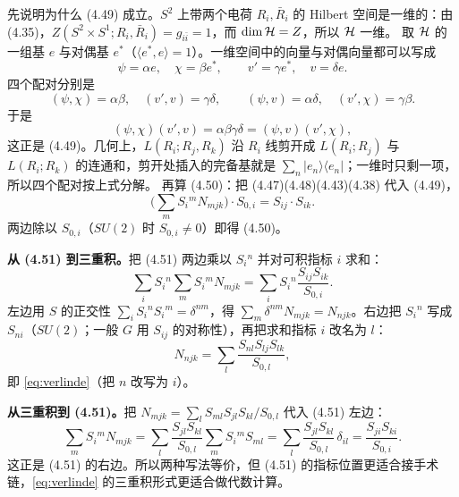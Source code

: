 \begin{derivation}
先说明为什么 (4.49) 成立。$S^2$ 上带两个电荷 $R_i,\bar R_i$ 的 Hilbert 空间是一维的：由 (4.35)，$Z(S^2\times S^1;R_i,\bar R_i)=g_{i\bar i}=1$，而 $\dim\mathcal{H}=Z$，所以 $\mathcal{H}$ 一维。
取 $\mathcal{H}$ 的一组基 $e$ 与对偶基 $e^*$（$\langle e^*,e\rangle=1$）。一维空间中的向量与对偶向量都可以写成
\[
\psi=\alpha e,\quad \chi=\beta e^*,\qquad v'=\gamma e^*,\quad v=\delta e .
\]
四个配对分别是
\[
(\psi,\chi)=\alpha\beta,\quad (v',v)=\gamma\delta,\qquad
(\psi,v)=\alpha\delta,\quad (v',\chi)=\gamma\beta .
\]
于是
\[
(\psi,\chi)(v',v)=\alpha\beta\gamma\delta=(\psi,v)(v',\chi),
\]
这正是 (4.49)。几何上，$L(R_i;R_j,R_k)$ 沿 $R_i$ 线剪开成 $L(R_i;R_j)$ 与 $L(R_i;R_k)$ 的连通和，剪开处插入的完备基就是 $\sum_n|e_n\rangle\langle e_n|$；一维时只剩一项，所以四个配对按上式分解。
再算 (4.50)：把 (4.47)(4.48)(4.43)(4.38) 代入 (4.49)，
\[
\Big(\sum_m S_i{}^m N_{mjk}\Big)\cdot S_{0,i}=S_{ij}\cdot S_{ik}.
\]
两边除以 $S_{0,i}$（$SU(2)$ 时 $S_{0,i}\neq0$）即得 (4.50)。\ours
\end{derivation}

\begin{derivation}[D-9.3：(4.51) 与三重积形式等价]
\textbf{从 (4.51) 到三重积。}把 (4.51) 两边乘以 $S_i{}^n$ 并对可积指标 $i$ 求和：
\[
\sum_i S_i{}^n\sum_m S_i{}^m N_{mjk}=\sum_i S_i{}^n\frac{S_{ij}S_{ik}}{S_{0,i}} .
\]
左边用 $S$ 的正交性 $\sum_i S_i{}^n S_i{}^m=\delta^{nm}$，得 $\sum_m\delta^{nm}N_{mjk}=N_{njk}$。右边把 $S_i{}^n$ 写成 $S_{ni}$（$SU(2)$；一般 $G$ 用 $S_{ij}$ 的对称性），再把求和指标 $i$ 改名为 $l$：
\[
N_{njk}=\sum_l\frac{S_{nl}S_{lj}S_{lk}}{S_{0,l}},
\]
即 \eqref{eq:verlinde}（把 $n$ 改写为 $i$）。

\textbf{从三重积到 (4.51)。}把 $N_{mjk}=\sum_l S_{ml}S_{jl}S_{kl}/S_{0,l}$ 代入 (4.51) 左边：
\[
\sum_m S_i{}^m N_{mjk}
=\sum_l\frac{S_{jl}S_{kl}}{S_{0,l}}\sum_m S_i{}^m S_{ml}
=\sum_l\frac{S_{jl}S_{kl}}{S_{0,l}}\,\delta_{il}
=\frac{S_{ji}S_{ki}}{S_{0,i}} .
\]
这正是 (4.51) 的右边。所以两种写法等价，但 (4.51) 的指标位置更适合接手术链，\eqref{eq:verlinde} 的三重积形式更适合做代数计算。\ours
\end{derivation}

